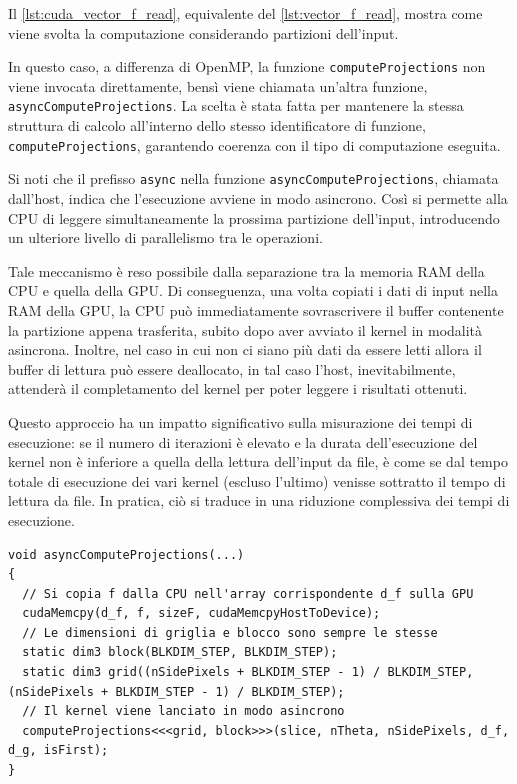 \documentclass[12pt,a4paper]{report}
\begin{document}
Il \autoref{lst:cuda_vector_f_read}, equivalente del \autoref{lst:vector_f_read}, mostra come viene svolta la computazione
considerando partizioni dell'input.

In questo caso, a differenza di OpenMP, la funzione \lstinline{computeProjections} non viene invocata direttamente, bensì viene
chiamata un'altra funzione, \mbox{\lstinline{asyncComputeProjections}.}
La scelta è stata fatta per mantenere la stessa struttura di calcolo all'interno dello stesso identificatore di funzione,
\lstinline{computeProjections}, garantendo coerenza con il tipo di computazione eseguita.

Si noti che il prefisso \lstinline{async} nella funzione \mbox{\lstinline{asyncComputeProjections},} chiamata dall'host, indica
che l'esecuzione avviene in modo asincrono.
Così si permette alla CPU di leggere simultaneamente la prossima partizione dell'input, introducendo un ulteriore livello di
parallelismo tra le operazioni.

Tale meccanismo è reso possibile dalla separazione tra la memoria RAM della CPU e quella della GPU.
Di conseguenza, una volta copiati i dati di input nella RAM della GPU, la CPU può immediatamente sovrascrivere il buffer
contenente la partizione appena trasferita, subito dopo aver avviato il kernel in modalità asincrona.
Inoltre, nel caso in cui non ci siano più dati da essere letti allora il buffer di lettura può essere deallocato, in tal caso
l'host, inevitabilmente, attenderà il completamento del kernel per poter leggere i risultati ottenuti.

Questo approccio ha un impatto significativo sulla misurazione dei tempi di esecuzione: se il numero di iterazioni è elevato e la
durata dell'esecuzione del kernel non è inferiore a quella della lettura dell'input da file, è come se dal tempo totale di
esecuzione dei vari kernel (escluso l'ultimo) venisse sottratto il tempo di lettura da file.
In pratica, ciò si traduce in una riduzione complessiva dei tempi di esecuzione.

\begin{lstlisting}[language=CStyle, caption={Codice CUDA-C per il lancio del kernel.}, label={lst:cuda_launch_kernel}]
void asyncComputeProjections(...)
{
  // Si copia f dalla CPU nell'array corrispondente d_f sulla GPU
  cudaMemcpy(d_f, f, sizeF, cudaMemcpyHostToDevice);
  // Le dimensioni di griglia e blocco sono sempre le stesse
  static dim3 block(BLKDIM_STEP, BLKDIM_STEP);
  static dim3 grid((nSidePixels + BLKDIM_STEP - 1) / BLKDIM_STEP, (nSidePixels + BLKDIM_STEP - 1) / BLKDIM_STEP);
  // Il kernel viene lanciato in modo asincrono
  computeProjections<<<grid, block>>>(slice, nTheta, nSidePixels, d_f, d_g, isFirst);
}
\end{lstlisting}
\end{document}
